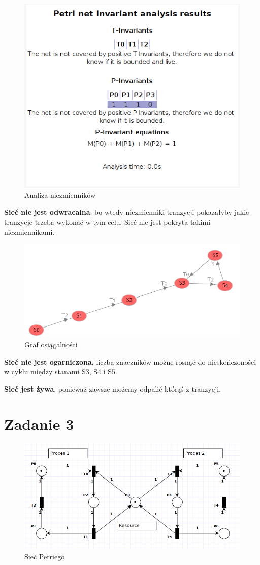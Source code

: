 \documentclass[12pt,a4paper,table]{article}
\begin{document}
    \begin{figure}[H]
        \centering
        \includegraphics[width=0.6\linewidth]{img/zad2-2.png}
        \caption{Analiza niezmienników}
        \label{fig:zad2-2}
    \end{figure}

    \textbf{Sieć nie jest odwracalna}, bo wtedy niezmienniki tranzycji pokazałyby jakie tranzycje trzeba wykonać
    w tym celu. Sieć nie jest pokryta takimi niezmiennikami.

    \begin{figure}[H]
        \centering
        \includegraphics[width=0.6\linewidth]{img/zad2-3.png}
        \caption{Graf osiągalności}
        \label{fig:zad2-3}
    \end{figure}

    \textbf{Sieć nie jest ogarniczona}, liczba znaczników możne rosnąć do nieskończoności w cyklu między stanami
    S3, S4 i S5.

    \textbf{Sieć jest żywa}, ponieważ zawsze możemy odpalić którąś z tranzycji.

    \section{Zadanie 3}

    \begin{figure}[H]
        \centering
        \includegraphics[width=0.8\linewidth]{img/zad3-1.png}
        \caption{Sieć Petriego}
        \label{fig:zad3-1}
    \end{figure}
\end{document}
